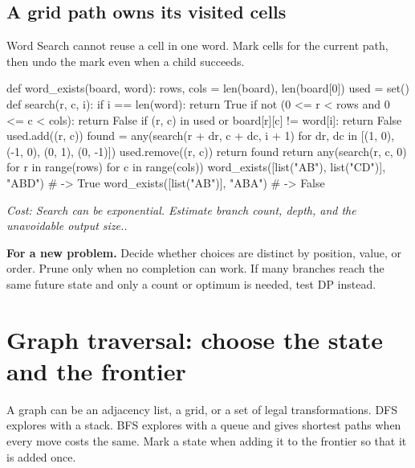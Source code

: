 \documentclass[11pt]{article}
\newcommand{\transfer}[1]{\par\textbf{For a new problem.} #1\par}
\newcommand{\cost}[1]{\par\textit{Cost: #1.}\par}
\begin{document}
\subsection{A grid path owns its visited cells}
Word Search cannot reuse a cell in one word. Mark cells for the current path, then undo the mark even when a child succeeds.
\par\noindent\begin{minipage}{\linewidth}
\hypertarget{example-start-39}{}
\begin{pyex}
def word_exists(board, word):
    rows, cols = len(board), len(board[0])
    used = set()
    def search(r, c, i):
        if i == len(word):
            return True
        if not (0 <= r < rows and 0 <= c < cols):
            return False
        if (r, c) in used or board[r][c] != word[i]:
            return False
        used.add((r, c))
        found = any(search(r + dr, c + dc, i + 1)
                    for dr, dc in [(1, 0), (-1, 0), (0, 1), (0, -1)])
        used.remove((r, c))
        return found
    return any(search(r, c, 0) for r in range(rows) for c in range(cols))
word_exists([list("AB"), list("CD")], "ABD") # -> True
word_exists([list("AB")], "ABA")      # -> False
\end{pyex}
\hypertarget{example-end-39}{}
\end{minipage}\par
\cost{Search can be exponential. Estimate branch count, depth, and the unavoidable output size.}
\transfer{Decide whether choices are distinct by position, value, or order.
Prune only when no completion can work. If many branches reach the same future state and only a count or optimum is needed, test DP instead.}

\section{Graph traversal: choose the state and the frontier}\label{sec:graph}
A graph can be an adjacency list, a grid, or a set of legal transformations.
DFS explores with a stack. BFS explores with a queue and gives shortest paths when every move costs the same.
Mark a state when adding it to the frontier so that it is added once.
\end{document}
